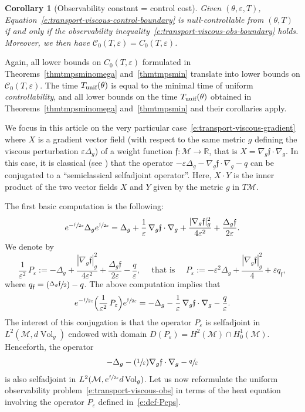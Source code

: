 \documentclass[JEP,XML,SOM,Unicode]{cedram}
\newcommand{\unif}{\textup{unif}}
\newcommand{\Psfrac}[2]{(\sfrac{#1}{#2})}
\newtheorem{corollary}[lemma]{Corollary}
\theoremstyle{definition}
\newcommand{\M}{\ensuremath{\mathcal M}}
\newcommand{\calC}{\ensuremath{\mathcal C}}
\newcommand{\mb}[1]{\ensuremath{\mathbb{#1}}}
\newcommand{\R}{{\mb{R}}}
\newcommand{\f}{\ensuremath{\mathfrak{f}}}
\DeclareMathOperator{\Vol}{Vol}
\newcommand\Lap{\Delta_{g}}
\newcommand\nablag{\nabla_{g}}
\let\eps\varepsilon
\let\q q
\newcommand{\qf}{q_{\f}}
\begin{document}
\begin{corollary}[Observability constant = control cost]
Given $(\theta, \eps, T)$, Equation~\eqref{e:transport-viscous-control-boundary} is null-controllable from $(\theta, T)$ if and only if the observability inequality~\eqref{e:transport-viscous-obs-boundary} holds.
Moreover, we then have $\mathcal{C}_0(T,\eps)= C_0(T,\eps)$.
\end{corollary}
Again, all lower bounds on $C_0(T,\eps)$ formulated in Theorems~\ref{thmtmpsminomega} and~\ref{thmtmpsmin} translate into lower bounds on $\calC_0(T,\eps)$. The time $T_{\unif}(\theta)$ is equal to the minimal time of uniform {\em controllability}, and all lower bounds on the time $T_{\unif}(\theta)$ obtained in Theorems~\ref{thmtmpsminomega} and~\ref{thmtmpsmin} and their corollaries apply.

\label{sectconjug}

We focus in this article on the very particular case~\eqref{e:transport-viscous-gradient} where $X$ is a gradient vector field (with respect to the same metric $g$ defining the viscous perturbation $\eps \Lap$) of a weight function $\f : \M\to \R$, that is $X = \nablag \f \cdot \nablag$. In this case, it is classical (see \eg \cite{Witten:82,HS:85}) that the operator $-\eps \Lap - \nablag \f \cdot \nablag-\q$ can be conjugated to a ``semiclassical selfadjoint operator''. Here, $X\cdot Y$ is the inner product of the two vector fields $X$ and $Y$ given by the metric $g$ in $T\M$.

The first basic computation is the following:
\[
e^{-\sfrac{\f}{2\eps}} \Lap e^{\sfrac{\f}{2\eps}} = \Lap + \frac{1}{\eps}\,\nablag \f \cdot \nablag + \frac{|\nablag \f|_g^2}{4\eps^2} + \frac{\Lap \f}{2\eps}.
\]
We denote by
\begin{equation}
\label{e:def-Peps}
\frac{1}{\eps^2}\,P_\eps := - \Lap + \frac{|\nablag \f|_g^2}{4\eps^2} + \frac{\Lap \f}{2\eps}-\frac{ \q}{\eps}, \quad \text{ that is } \quad P_\eps := - \eps^2 \Lap + \frac{|\nablag \f|_g^2}{4} + \eps \qf,
\end{equation}
where $\qf= \Psfrac{\Lap \f}{2}-\q$. The above computation implies that
\begin{equation}
\label{e:trans-eps}
e^{-\sfrac{\f}{2\eps}} \Bigl( \frac{1}{\eps^2}\,P_\eps \Bigr)e^{\sfrac{\f}{2\eps}} = - \Lap - \frac{1}{\eps}\,\nablag \f \cdot \nablag-\frac{\q}{\eps}.
\end{equation}
The interest of this conjugation is that the operator $P_\eps$ is selfadjoint in $L^2(\M,d\Vol_g)$ endowed with domain $D(P_\eps) = H^2(\M)\cap H^1_0(\M)$. Henceforth, the operator
\[
- \Lap - \Psfrac{1}{\eps}\nablag \f \cdot \nablag-\sfrac{\q}{\eps}
\]
is also selfadjoint in $L^2(\M, e^{\sfrac{\f}{2\eps}} d\Vol_g)$.
Let us now reformulate the uniform observability problem~\eqref{e:transport-viscous-obs} in terms of the heat equation involving the operator $P_\eps$ defined in~\eqref{e:def-Peps}.
\end{document}
